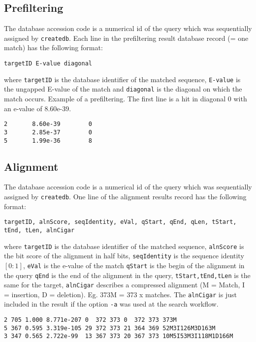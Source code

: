 \documentclass[11pt,a4paper]{scrreprt}
\begin{document}
\subsection{Prefiltering}
The database accession code is a numerical id of the query which was sequentially assigned by \texttt{createdb}. 
Each line in the prefiltering result database record (= one match) has the following format:

\begin{verbatim}
targetID E-value diagonal
\end{verbatim}

where \texttt{targetID} is the database identifier of the matched sequence, \texttt{E-value} is the ungapped E-value of the match and \texttt{diagonal} is the diagonal on which the match occurs. Example of a prefiltering. The first line is a hit in diagonal 0 with an e-value of 8.60e-39.

\begin{verbatim}
2       8.60e-39        0
3       2.85e-37        0
5       1.99e-36        8
\end{verbatim}

\subsection{Alignment}
The database accession code is a numerical id of the query which was sequentially assigned by \texttt{createdb}. 
One line of the alignment results record has the following format:

\begin{verbatim}
targetID, alnScore, seqIdentity, eVal, qStart, qEnd, qLen, tStart, tEnd, tLen, alnCigar
\end{verbatim}

where \texttt{targetID} is the database identifier of the matched sequence, \texttt{alnScore} is the bit score of the alignment in half bits, \texttt{seqIdentity} is the sequence identity $[0:1]$, \texttt{eVal} is the e-value of the match \texttt{qStart} is the begin of the alignment in the query \texttt{qEnd} is the end of the alignment in the query, 
 \texttt{tStart,tEnd,tLen} is the same for the target, \texttt{alnCigar} describes a compressed alignment (M = Match, I = insertion, D = deletion). Eg. 373M = 373 x matches. The \texttt{alnCigar} is just included in the result if the option \texttt{-a} was used at the search workflow.

\begin{verbatim}
2 705 1.000 8.771e-207 0  372 373 0  372 373 373M
5 367 0.595 3.319e-105 29 372 373 21 364 369 52M3I126M3D163M
3 347 0.565 2.722e-99  13 367 373 20 367 373 10M5I53M3I118M1D166M
\end{verbatim}
\end{document}
